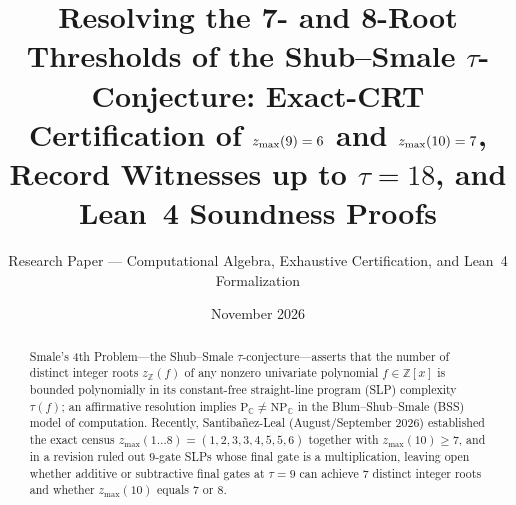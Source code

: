 \documentclass[11pt]{article}
\title{Resolving the 7- and 8-Root Thresholds of the Shub--Smale $\tau$-Conjecture: Exact-CRT Certification of $\zmax(9) = 6$ and $\zmax(10) = 7$, Record Witnesses up to $\tau = 18$, and Lean~4 Soundness Proofs}
\author{Research Paper --- Computational Algebra, Exhaustive Certification, and Lean~4 Formalization}
\date{November 2026}
\newcommand{\Z}{\mathbb{Z}}
\newcommand{\C}{\mathbb{C}}
\newcommand{\zmax}{z_{\max}}
\newcommand{\zZ}{z_{\Z}}
\begin{document}
\maketitle

\begin{abstract}
Smale's 4th Problem---the Shub--Smale $\tau$-conjecture---asserts that the number of distinct integer roots $\zZ(f)$ of any nonzero univariate polynomial $f \in \Z[x]$ is bounded polynomially in its constant-free straight-line program (SLP) complexity $\tau(f)$; an affirmative resolution implies $\mathrm{P}_{\C} \neq \mathrm{NP}_{\C}$ in the Blum--Shub--Smale (BSS) model of computation. Recently, Santiba\~{n}ez-Leal (August/September 2026) established the exact census $\zmax(1 \dots 8) = (1, 2, 3, 3, 4, 5, 5, 6)$ together with $\zmax(10) \ge 7$, and in a revision ruled out $9$-gate SLPs whose final gate is a multiplication, leaving open whether additive or subtractive final gates at $\tau = 9$ can achieve $7$ distinct integer roots and whether $\zmax(10)$ equals $7$ or $8$.


\end{abstract}
\end{document}
